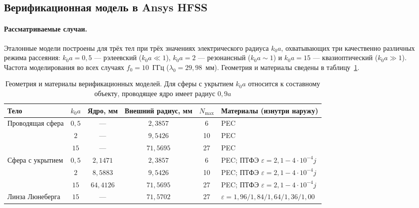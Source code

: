 \documentclass[11pt,a4paper]{article}
\begin{document}
\subsection{Верификационная модель в Ansys HFSS}
\label{sec:model-diff}

\paragraph{Рассматриваемые случаи.}
Эталонные модели построены для трёх тел при трёх значениях электрического радиуса
$k_0a$, охватывающих три качественно различных режима рассеяния: $k_0a = 0{,}5$ ---
рэлеевский ($k_0a \ll 1$), $k_0a = 2$ --- резонансный ($k_0a \sim 1$) и
$k_0a = 15$ --- квазиоптический ($k_0a \gg 1$). Частота моделирования во всех
случаях $f_0 = 10$~ГГц ($\lambda_0 = 29{,}98$~мм). Геометрия и материалы сведены в
таблицу~\ref{tab:geom}.

\begin{table}[ht]
  \centering
  \small
  \caption{Геометрия и материалы верификационных моделей. Для сферы с укрытием
  $k_0a$ относится к составному объекту, проводящее ядро имеет радиус $0{,}9a$}
  \label{tab:geom}
  \renewcommand{\arraystretch}{1.22}
  \begin{tabular}{@{}lccccl@{}}
    \toprule
    Тело & $k_0a$ & Ядро, мм & Внешний радиус, мм & $N_{\max}$ & Материалы (изнутри наружу) \\
    \midrule
    \multirow{3}{*}{Проводящая сфера}
      & $0{,}5$ & --- & $2{,}3857$  & 6  & PEC \\
      & $2$     & --- & $9{,}5426$  & 10 & PEC \\
      & $15$    & --- & $71{,}5695$ & 27 & PEC \\
    \midrule
    \multirow{3}{*}{Сфера с укрытием}
      & $0{,}5$ & $2{,}1471$  & $2{,}3857$  & 6  & PEC; ПТФЭ $\varepsilon = 2{,}1 - 4\cdot10^{-4}j$ \\
      & $2$     & $8{,}5883$  & $9{,}5426$  & 10 & PEC; ПТФЭ $\varepsilon = 2{,}1 - 4\cdot10^{-4}j$ \\
      & $15$    & $64{,}4126$ & $71{,}5695$ & 27 & PEC; ПТФЭ $\varepsilon = 2{,}1 - 4\cdot10^{-4}j$ \\
    \midrule
    Линза Люнеберга
      & $15$    & --- & $71{,}5702$ & 27 &
        $\varepsilon = 1{,}96 / 1{,}84 / 1{,}64 / 1{,}36 / 1{,}00$ \\
    \bottomrule
  \end{tabular}
\end{table}
\end{document}
